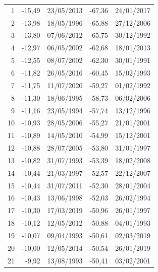 \documentclass[12pt]{iopart}
\begin{document}
\begin{longtable}{|r|rl|rl|}
1         & -15,49          & 23/05/2013     & -67,36          & 24/01/2017     \\
2         & -13,98          & 18/05/1996     & -65,88          & 27/12/2006     \\
3         & -13,80          & 07/06/2012     & -65,75          & 30/12/1992     \\
4         & -12,97          & 06/05/2002     & -62,68          & 18/01/2013     \\
5         & -12,55          & 08/07/2002     & -62,30          & 30/01/1991     \\
6         & -11,82          & 26/05/2016     & -60,45          & 15/02/1993     \\
7         & -11,75          & 11/07/2020     & -59,27          & 01/02/1992     \\
8         & -11,30          & 18/06/1995     & -58,73          & 06/02/2006     \\
9         & -11,16          & 23/05/1994     & -57,74          & 13/12/1996     \\
10        & -10,93          & 28/05/2006     & -55,27          & 21/01/2001     \\
11        & -10,89          & 14/05/2010     & -54,99          & 15/12/2001     \\
12        & -10,88          & 28/07/2005     & -53,80          & 31/01/1997     \\
13        & -10,82          & 31/07/1993     & -53,39          & 18/02/2008     \\
14        & -10,44          & 21/03/1997     & -52,57          & 22/12/2007     \\
15        & -10,44          & 31/07/2011     & -52,30          & 28/01/2004     \\
16        & -10,43          & 13/06/1998     & -52,03          & 26/02/1994     \\
17        & -10,30          & 17/03/2019     & -50,96          & 26/01/1997     \\
18        & -10,12          & 12/05/2012     & -50,88          & 04/01/1993     \\
19        & -10,07          & 09/04/1993     & -50,61          & 02/03/2019     \\
20        & -10,00          & 12/05/2014     & -50,54          & 26/01/2019     \\
21        & -9,92           & 13/08/1993     & -50,41          & 03/02/2001     \\

\end{longtable}
\end{document}
